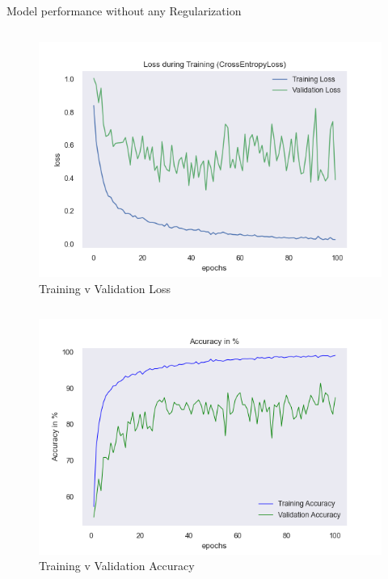 \documentclass[aspectratio=169]{beamer}
\begin{document}
{\begin{frame}{Model performance without any Regularization}
        \begin{column}{.5\textwidth}
            \begin{figure}
                \centering
                \includegraphics[width=1\textwidth]{img/baptiste_100epoches_val_loss__Dropouts_False__BatchNorm_False.png}
                \caption{Training v Validation Loss}
            \end{figure}
        \end{column}
        \begin{column}{.5\textwidth}
            \begin{figure}
                \centering
                \includegraphics[width=1\textwidth]{img/baptiste_100epoches_train_accuracy__Dropouts_False__BatchNorm_False.png}
                \caption{Training v Validation Accuracy}
            \end{figure}
        \end{column}
    \end{frame}

}
\end{document}
